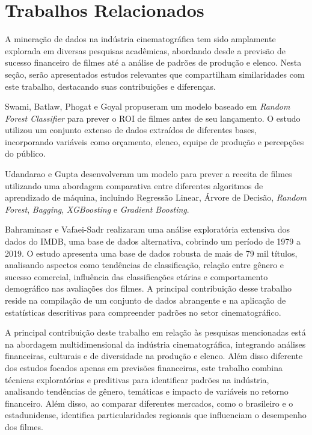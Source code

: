 \section{Trabalhos Relacionados}

A mineração de dados na indústria cinematográfica tem sido amplamente explorada em diversas pesquisas acadêmicas, abordando desde a previsão de sucesso financeiro de filmes até a análise de padrões de produção e elenco. Nesta seção, serão apresentados estudos relevantes que compartilham similaridades com este trabalho, destacando suas contribuições e diferenças.

Swami, Batlaw, Phogat e Goyal \cite{swami2021} propuseram um modelo baseado em \textit{Random Forest Classifier} para prever o \acrshort{ROI} de filmes antes de seu lançamento. O estudo utilizou um conjunto extenso de dados extraídos de diferentes bases, incorporando variáveis como orçamento, elenco, equipe de produção e percepções do público.

Udandarao e Gupta \cite{udandarao2024} desenvolveram um modelo para prever a receita de filmes utilizando uma abordagem comparativa entre diferentes algoritmos de aprendizado de máquina, incluindo Regressão Linear, Árvore de Decisão, \textit{Random Forest}, \textit{Bagging}, \textit{XGBoosting} e \textit{Gradient Boosting}. 

Bahraminasr e Vafaei-Sadr \cite{bahraminasr2020} realizaram uma análise exploratória extensiva dos dados do \acrfull{IMDB}, uma base de dados alternativa, cobrindo um período de 1979 a 2019. O estudo apresenta uma base de dados robusta de mais de 79 mil títulos, analisando aspectos como tendências de classificação, relação entre gênero e sucesso comercial, influência das classificações etárias e comportamento demográfico nas avaliações dos filmes. A principal contribuição desse trabalho reside na compilação de um conjunto de dados abrangente e na aplicação de estatísticas descritivas para compreender padrões no setor cinematográfico.


 A principal contribuição deste trabalho em relação às pesquisas mencionadas está na abordagem multidimensional da indústria cinematográfica, integrando análises financeiras, culturais e de diversidade na produção e elenco. Além disso diferente dos estudos focados apenas em previsões financeiras, este trabalho combina técnicas exploratórias e preditivas para identificar padrões na indústria, analisando tendências de gênero, temáticas e impacto de variáveis no retorno financeiro. Além disso, ao comparar diferentes mercados, como o brasileiro e o estadunidense, identifica particularidades regionais que influenciam o desempenho dos filmes.


